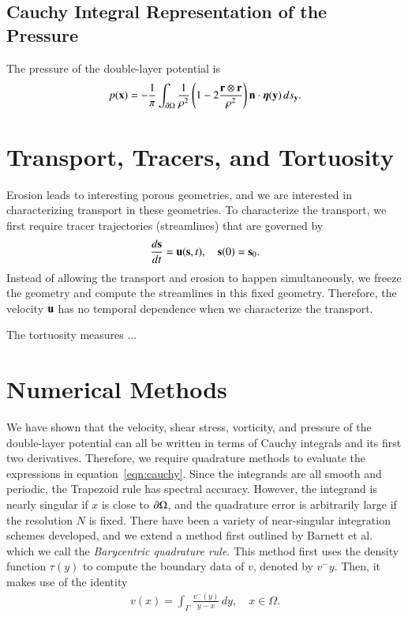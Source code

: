 \documentclass[preprint, 10pt]{elsarticle}
\begin{document}
\subsection{Cauchy Integral Representation of the Pressure}
The pressure of the double-layer potential is
\begin{align}
  p({\mathbf{x}}) = -\frac{1}{\pi} \int_{{\partial}\Omega} \frac{1}{\rho^2}
    \left(1 - 2 \frac{{\mathbf{r}} \otimes {\mathbf{r}}}{\rho^2} \right) {\mathbf{n}}
    \cdot {\boldsymbol\eta}({\mathbf{y}}) \, ds_{\mathbf{y}}.
\end{align}




\section{Transport, Tracers, and Tortuosity}
Erosion leads to interesting porous geometries, and we are interested in
characterizing transport in these geometries.  To characterize the
transport, we first require tracer trajectories (streamlines) that are
governed by
\begin{align}
  \frac{d{\mathbf{s}}}{dt} = {\mathbf{u}}({\mathbf{s}},t), \quad {\mathbf{s}}(0) = {\mathbf{s}}_0.
\end{align}
Instead of allowing the transport and erosion to happen simultaneously,
we freeze the geometry and compute the streamlines in this fixed
geometry.  Therefore, the velocity ${\mathbf{u}}$ has no temporal dependence when
we characterize the transport.

The tortuosity measures ...


\section{Numerical Methods}
\label{s:method}
We have shown that the velocity, shear stress, vorticity, and pressure
of the double-layer potential can all be written in terms of Cauchy
integrals and its first two derivatives.  Therefore, we require
quadrature methods to evaluate the expressions in
equation~\eqref{eqn:cauchy}.  Since the integrands are all smooth and
periodic, the Trapezoid rule has spectral accuracy.  However, the
integrand is nearly singular if $x$ is close to ${\partial}\Omega$, and the
quadrature error is arbitrarily large if the resolution $N$ is fixed.
There have been a variety of near-singular integration schemes
developed, and we extend a method first outlined by Barnett et
al.~\cite{bar-wu-vee2015} which we call the {\em Barycentric quadrature
rule}.  This method first uses the density function $\tau(y)$ to compute
the boundary data of $v$, denoted by $v^-{y}$.  Then, it makes use
of the identity
\begin{align}
  v(x) = \int_{\Gamma} \frac{v^{-}(y)}{y-x} \, dy, 
  \quad x \in \Omega.
\end{align}
\end{document}
